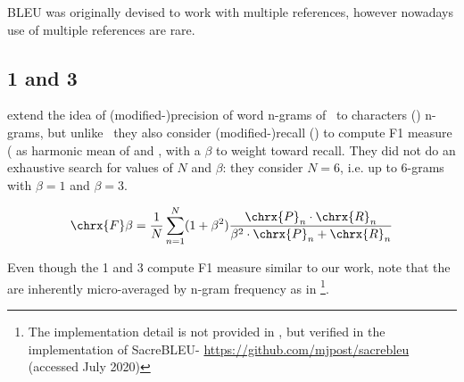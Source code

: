 BLEU was originally devised to work with multiple references, however nowadays use of multiple references are rare. 



\subsection{1 and 3}

\citet{popovic-2015-chrf} extend the idea of (modified-)precision of word n-grams of \bleu\ to characters () n-grams, but unlike \bleu\ they also consider (modified-)recall () to compute F1 measure ( as harmonic mean of  and , with a $\beta$ to weight toward recall.
They did not do an exhaustive search for values of $N$ and $\beta$: they consider $N=6$, i.e. up to 6-grams with $\beta=1$ and $\beta=3$.

$$\chrx{F}\beta = \frac{1}{N} \sum_{n=1}^{N}(1 + \beta^2) \frac{\chrx{P}_n \cdot \chrx{R}_n}{ \beta^2 \cdot \chrx{P}_n + \chrx{R}_n}$$

Even though the 1 and 3 compute F1 measure similar to our work, note that the   are inherently micro-averaged by n-gram frequency as in \bleu \footnote{The implementation detail is not provided in \cite{popovic-2015-chrf}, but verified in the implementation of SacreBLEU- \url{https://github.com/mjpost/sacrebleu} (accessed July 2020) }.




